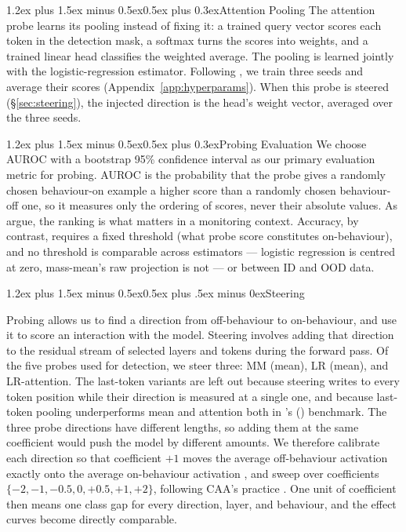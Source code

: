 \documentclass[conference]{IEEEtran}
\makeatletter
\renewcommand{\subsection}{\@startsection{subsection}{2}{\z@}%
  {1.2ex plus 1.5ex minus 0.5ex}{0.5ex plus .5ex minus 0ex}{\normalfont\normalsize\itshape}}
\renewcommand{\subsubsection}{\@startsection{subsubsection}{3}{1em}%
  {1.2ex plus 1.5ex minus 0.5ex}{0.5ex plus 0.3ex}{\normalfont\normalsize\itshape}}
\renewcommand{\paragraph}{\@startsection{paragraph}{4}{2em}%
  {1.2ex plus 1.5ex minus 0.5ex}{0.5ex plus 0.3ex}{\normalfont\normalsize\itshape}}
\makeatother
\begin{document}
\paragraph{Attention Pooling}
The attention probe \citep{mckenzie2025} learns its pooling instead of fixing
it: a trained query vector scores each token in the detection mask, a softmax
turns the scores into weights, and a trained linear head classifies the
weighted average. The pooling is learned jointly with the logistic-regression
estimator. Following \citeauthor{mckenzie2025}, we train three seeds and average their scores (Appendix~\ref{app:hyperparams}).
When this
probe is steered (§\ref{sec:steering}), the injected direction is the head's
weight vector, averaged over the three seeds.

\subsubsection{Probing Evaluation}
We choose AUROC with a
bootstrap 95\% confidence interval as our primary evaluation metric for
probing. AUROC is the probability that the probe gives a randomly chosen
behaviour-on example a higher score than a randomly chosen behaviour-off one,
so it measures only the ordering of scores, never their absolute values. As
\citet{mckenzie2025} argue, the ranking is what matters in a monitoring
context. Accuracy, by contrast, requires a fixed threshold (what probe score 
constitutes on-behaviour), and no threshold is comparable across 
estimators — logistic regression is centred at zero, 
mass-mean's raw projection is not — or between ID and OOD data.

\subsection{Steering}
\label{sec:steering}

Probing allows us to find a direction from off-behaviour to on-behaviour, and use it to
score an interaction with the model. Steering involves adding that direction to
the residual stream of selected layers and tokens during the forward pass.
Of the five probes used for detection, we steer
three: MM (mean), LR (mean), and LR-attention. The
last-token variants are left out because steering writes to every token
position while their direction is measured at a single one, and because
last-token pooling underperforms mean and attention both in
\citeauthor{mckenzie2025}'s (\citeyear{mckenzie2025}) benchmark. The three probe directions
have different lengths, so adding them at the
same coefficient would push the model by different amounts.
We therefore calibrate each direction so that
coefficient $+1$ moves the average off-behaviour activation exactly onto the
average on-behaviour activation \citep{marks2024}, and sweep over coefficients
$\{-2, -1, -0.5, 0, +0.5, +1, +2\}$, following CAA's practice
\citep{rimsky2024}. One unit of coefficient then
means one class gap for every direction, layer, and behaviour, and the effect
curves become directly comparable.
\end{document}
